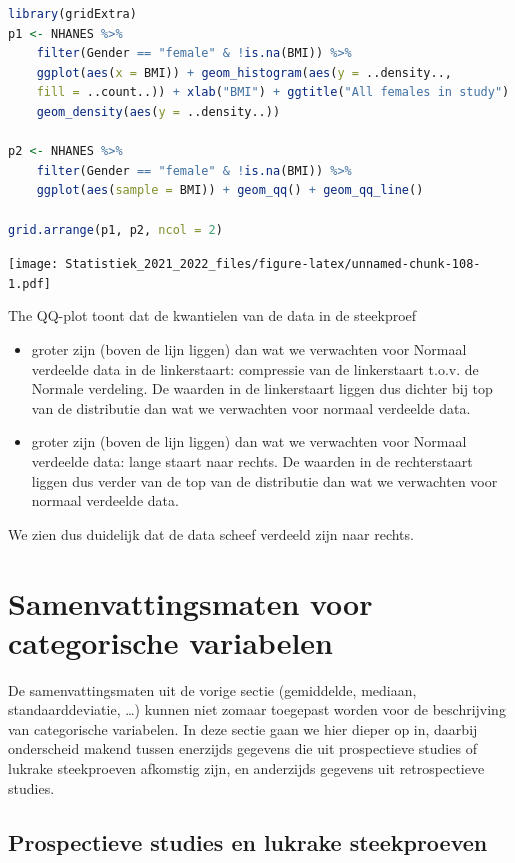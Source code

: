 \documentclass[
  12pt,dutch,coursenotes]{book}
\theoremstyle{definition}
\theoremstyle{definition}
\theoremstyle{definition}
\theoremstyle{definition}
\theoremstyle{remark}
\begin{document}
\begin{lstlisting}[language=R]
library(gridExtra)
p1 <- NHANES %>%
    filter(Gender == "female" & !is.na(BMI)) %>%
    ggplot(aes(x = BMI)) + geom_histogram(aes(y = ..density..,
    fill = ..count..)) + xlab("BMI") + ggtitle("All females in study") +
    geom_density(aes(y = ..density..))

p2 <- NHANES %>%
    filter(Gender == "female" & !is.na(BMI)) %>%
    ggplot(aes(sample = BMI)) + geom_qq() + geom_qq_line()

grid.arrange(p1, p2, ncol = 2)
\end{lstlisting}

\texttt{[image: Statistiek\_2021\_2022\_files/figure-latex/unnamed-chunk-108-1.pdf]}

The QQ-plot toont dat de kwantielen van de data in de steekproef

\begin{itemize}
\item
  groter zijn (boven de lijn liggen) dan wat we verwachten voor Normaal verdeelde data in de linkerstaart: compressie van de linkerstaart t.o.v. de Normale verdeling. De waarden in de linkerstaart liggen dus dichter bij top van de distributie dan wat we verwachten voor normaal verdeelde data.
\item
  groter zijn (boven de lijn liggen) dan wat we verwachten voor Normaal verdeelde data: lange staart naar rechts. De waarden in de rechterstaart liggen dus verder van de top van de distributie dan wat we verwachten voor normaal verdeelde data.
\end{itemize}

We zien dus duidelijk dat de data scheef verdeeld zijn naar rechts.

\hypertarget{sec:explCatVar}{%
\section{Samenvattingsmaten voor categorische variabelen}\label{sec:explCatVar}}

De samenvattingsmaten uit de vorige sectie (gemiddelde, mediaan, standaarddeviatie, \ldots) kunnen niet zomaar toegepast worden voor de beschrijving van categorische variabelen. In deze sectie gaan we hier dieper op in, daarbij onderscheid makend tussen enerzijds gegevens die uit prospectieve studies of lukrake steekproeven afkomstig zijn, en anderzijds gegevens uit retrospectieve studies.

\hypertarget{prospectieve-studies-en-lukrake-steekproeven}{%
\subsection{Prospectieve studies en lukrake steekproeven}\label{prospectieve-studies-en-lukrake-steekproeven}}
\end{document}
